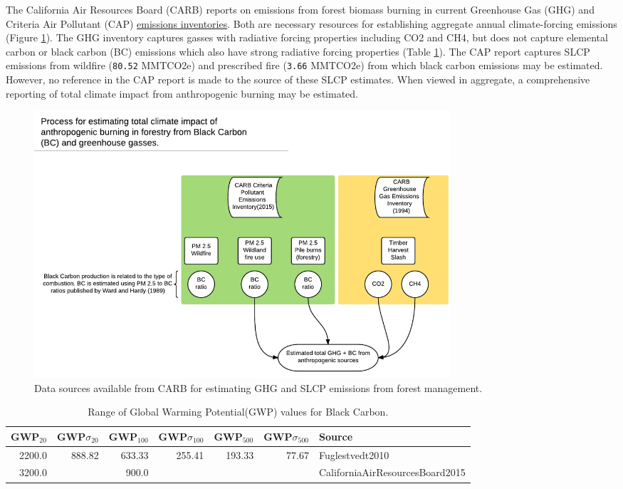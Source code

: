 \documentclass[a4paper]{article}
\begin{document}
The California Air Resources Board (CARB) reports on
emissions from forest biomass burning in current Greenhouse Gas (GHG) and Criteria Air
Pollutant (CAP) 
\href{http://www.arb.ca.gov/ei/ei.htm}{emissions inventories}. Both are necessary resources for establishing
aggregate annual climate-forcing emissions (Figure \ref{fig:burn_diag}). The GHG inventory captures
gasses with radiative forcing properties including CO2 and CH4, but does not capture elemental
carbon or black carbon (BC) emissions which also have strong radiative
forcing properties (Table \ref{tab:bc_gwp}). The \citet{CaliforniaAirResourcesBoard2015,CaliforniaAirResourcesBoard2016}
CAP report captures SLCP emissions from wildfire
(\texttt{80.52} MMTCO2e) and prescribed fire
(\texttt{3.66} MMTCO2e) from which black carbon emissions may be estimated. However, no reference in the CAP report is made to the source of these
SLCP estimates. When viewed in aggregate, a comprehensive reporting of total climate impact from anthropogenic burning may be estimated. 

\begin{figure}[htb]
\centering
\includegraphics[width=0.75\textwidth]{./graphics/burning.pdf}
\caption{Data sources available from CARB for estimating GHG and SLCP emissions from forest management. \label{fig:burn_diag}}
\end{figure}


\begin{table}[htb]
\caption{Range of Global Warming Potential(GWP) values for Black Carbon.\label{tab:bc_gwp}}
\centering
\begin{tabular}{rrrrrrl}
GWP$_{\text{20}}$ & GWP$\sigma$$_{\text{20}}$ & GWP$_{\text{100}}$ & GWP$\sigma$$_{\text{100}}$ & GWP$_{\text{500}}$ & GWP$\sigma$$_{\text{500}}$ & Source\\
\hline
2200.0 & 888.82 & 633.33 & 255.41 & 193.33 & 77.67 & Fuglestvedt2010\\
3200.0 &  & 900.0 &  &  &  & CaliforniaAirResourcesBoard2015\\
\end{tabular}
\end{table}
\end{document}
